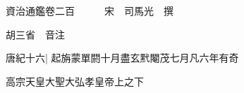 






























































資治通鑑卷二百　　　宋　司馬光　撰

胡三省　音注

唐紀十六|{
	起旃蒙單閼十月盡玄黓閹茂七月凡六年有奇}


高宗天皇大聖大弘孝皇帝上之下

